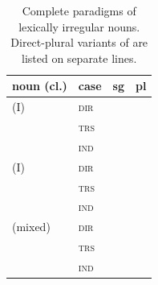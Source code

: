 \begin{table}[ht]
  \footnotesize
  \caption{Complete paradigms of lexically irregular nouns. Direct-plural variants of  are listed on separate lines.}
  \ifparadigmappendix\else\label{tab:nm-irregular-paradigms}\fi
  \begin{tabularx}{\textwidth}{l l L L}
    \toprule
    {\sc noun (cl.)} & {\sc case} & {\sc sg} & {\sc pl} \\
    \midrule
     (I) & \textsc{dir} &  &  \\
     & \textsc{trs} &  &  \\
     & \textsc{ind} &  &  \\
    \addlinespace
     (I) & \textsc{dir} &  &  \\
     & \textsc{trs} &  &  \\
     & \textsc{ind} &  &  \\
    \addlinespace
     (mixed) & \textsc{dir} &  &  \\
     & \textsc{trs} &  &  \\
     & \textsc{ind} &  &  \\
    \bottomrule
  \end{tabularx}
\end{table}
